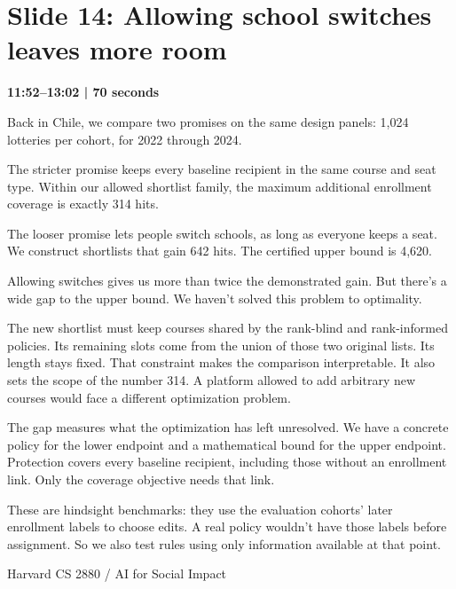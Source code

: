 \documentclass[11pt]{article}
\begin{document}
\section*{Slide 14: Allowing school switches leaves more room}
{\color{navy}\textbf{11:52--13:02 | 70 seconds}}\par\medskip
Back in Chile, we compare two promises on the same design panels: 1,024 lotteries per cohort, for 2022 through 2024.
\par
The stricter promise keeps every baseline recipient in the same course and seat type. Within our allowed shortlist family, the maximum additional enrollment coverage is exactly 314 hits.
\par
The looser promise lets people switch schools, as long as everyone keeps a seat. We construct shortlists that gain 642 hits. The certified upper bound is 4,620.
\par
Allowing switches gives us more than twice the demonstrated gain. But there's a wide gap to the upper bound. We haven't solved this problem to optimality.
\par
The new shortlist must keep courses shared by the rank-blind and rank-informed policies. Its remaining slots come from the union of those two original lists. Its length stays fixed. That constraint makes the comparison interpretable. It also sets the scope of the number 314. A platform allowed to add arbitrary new courses would face a different optimization problem.
\par
The gap measures what the optimization has left unresolved. We have a concrete policy for the lower endpoint and a mathematical bound for the upper endpoint. Protection covers every baseline recipient, including those without an enrollment link. Only the coverage objective needs that link.
\par
These are hindsight benchmarks: they use the evaluation cohorts' later enrollment labels to choose edits. A real policy wouldn't have those labels before assignment. So we also test rules using only information available at that point.
\par
\newpage
{\small Harvard CS 2880 / AI for Social Impact}\par
\end{document}
